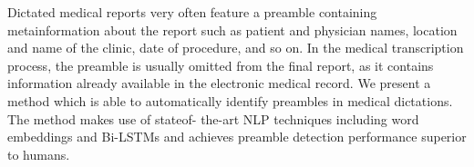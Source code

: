 Dictated medical reports very often feature a preamble containing metainformation about the report such as patient and physician names, location and name of the clinic, date of procedure, and so on. In the medical transcription process, the preamble is usually omitted from the final report, as it contains information already available in the electronic medical record. We present a method which is able to automatically identify preambles in medical dictations. The method makes use of stateof- the-art NLP techniques including word embeddings and Bi-LSTMs and achieves preamble detection performance superior to humans.
